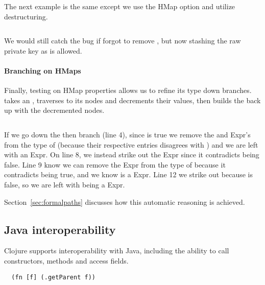 The next example is the same except we use the 
HMap option
and
utilize destructuring.

\begin{exmp}
\inputminted[firstline=10,lastline=21]{clojure}{code/demo/src/demo/key2.clj}
\end{exmp}

We would still catch the bug if  forgot to remove ,
but now stashing the raw private key as  is allowed.

\paragraph{Branching on HMaps} Finally, testing on HMap properties
allows us to refine its type down branches.  takes an
, traverses to its nodes and decrements their values, then
builds the  back up with the decremented nodes.

\begin{exmp}
\inputminted[linenos,firstnumber=1,firstline=15,lastline=27]{clojure}{code/demo/src/demo/hmap.clj}
\label{example:decmap}
\end{exmp}

If we go down the then branch (line 4), since  is true
we remove
the  and 
Expr's from the type of  (because their respective  entries disagrees with )
and we are left with an  Expr.
On line 8,
we instead strike out the  Expr since it contradicts  being false. 
Line 9 know we can
remove the  Expr from the type of  because it contradicts  being true,
and we know  is a  Expr.
Line 12 we strike out  because  is false,
so we are left with  being a  Expr.

Section~\ref{sec:formalpaths} discusses how this automatic reasoning is achieved.

\subsection{Java interoperability}
\label{sec:overviewjavainterop}

Clojure supports interoperability with Java, including the ability to
call constructors, methods and access fields.

\begin{verbatim}
  (fn [f] (.getParent f))
\end{verbatim}

